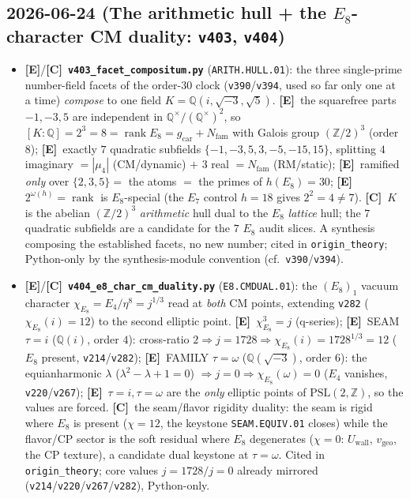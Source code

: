 \documentclass[11pt]{article}
\providecommand{\mE}{\textbf{[E]}}\providecommand{\mC}{\textbf{[C]}}
\providecommand{\vref}[1]{\texttt{#1}}
\providecommand{\gcar}{g_{\mathrm{car}}}\providecommand{\Nfam}{N_{\mathrm{fam}}}
\begin{document}
\subsection*{2026-06-24 (The arithmetic hull + the $E_8$-character CM duality: \texttt{v403}, \texttt{v404})}
\begin{itemize}
\item \mE/\mC\ \textbf{\texttt{v403\_facet\_compositum.py}} (\texttt{ARITH.HULL.01}): the three single-prime number-field facets of the order-$30$ clock (\vref{v390}/\vref{v394}, used so far only one at a time) \emph{compose} to one field $K=\mathbb Q(i,\sqrt{-3},\sqrt5)$. \mE\ the squarefree parts $-1,-3,5$ are independent in $\mathbb Q^\times/(\mathbb Q^\times)^2$, so $[K:\mathbb Q]=2^3=8=\operatorname{rank}E_8=\gcar{+}\Nfam$ with Galois group $(\mathbb Z/2)^3$ (order $8$); \mE\ exactly $7$ quadratic subfields $\{-1,-3,5,3,-5,-15,15\}$, splitting $4$ imaginary $=|\mu_4|$ (CM/dynamic) $+$ $3$ real $=\Nfam$ (RM/static); \mE\ ramified \emph{only} over $\{2,3,5\}=$ the atoms $=$ the primes of $h(E_8)=30$; \mE\ $2^{\omega(h)}=\operatorname{rank}$ is $E_8$-special (the $E_7$ control $h=18$ gives $2^2=4\neq7$). \mC\ $K$ is the abelian $(\mathbb Z/2)^3$ \emph{arithmetic} hull dual to the $E_8$ \emph{lattice} hull; the $7$ quadratic subfields are a candidate for the $7$ $E_8$ audit slices. A synthesis composing the established facets, no new number; cited in \texttt{origin\_theory}; Python-only by the synthesis-module convention (cf.\ \vref{v390}/\vref{v394}).
\item \mE/\mC\ \textbf{\texttt{v404\_e8\_char\_cm\_duality.py}} (\texttt{E8.CMDUAL.01}): the $(E_8)_1$ vacuum character $\chi_{E_8}=E_4/\eta^8=j^{1/3}$ read at \emph{both} CM points, extending \vref{v282} ($\chi_{E_8}(i)=12$) to the second elliptic point. \mE\ $\chi_{E_8}^3=j$ (q-series); \mE\ SEAM $\tau{=}i$ ($\mathbb Q(i)$, order $4$): cross-ratio $2\Rightarrow j=1728\Rightarrow\chi_{E_8}(i)=1728^{1/3}=12$ ($E_8$ present, \vref{v214}/\vref{v282}); \mE\ FAMILY $\tau{=}\omega$ ($\mathbb Q(\sqrt{-3})$, order $6$): the equianharmonic $\lambda$ ($\lambda^2{-}\lambda{+}1=0$) $\Rightarrow j=0\Rightarrow\chi_{E_8}(\omega)=0$ ($E_4$ vanishes, \vref{v220}/\vref{v267}); \mE\ $\tau{=}i,\tau{=}\omega$ are the \emph{only} elliptic points of $\mathrm{PSL}(2,\mathbb Z)$, so the values are forced. \mC\ the seam/flavor rigidity duality: the seam is rigid where $E_8$ is present ($\chi=12$, the keystone \texttt{SEAM.EQUIV.01} closes) while the flavor/CP sector is the soft residual where $E_8$ degenerates ($\chi=0$: $U_{\mathrm{wall}}$, $v_{\mathrm{geo}}$, the CP texture), a candidate dual keystone at $\tau{=}\omega$. Cited in \texttt{origin\_theory}; core values $j=1728/j=0$ already mirrored (\vref{v214}/\vref{v220}/\vref{v267}/\vref{v282}), Python-only.
\end{itemize}
\end{document}

